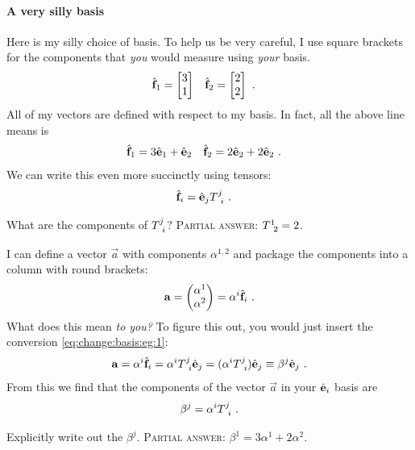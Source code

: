 \paragraph{A very silly basis}
Here is my silly choice of basis. To help us be very careful, I use square brackets for the components that \emph{you} would measure using \emph{your} basis. 
\begin{align}
    \hat{\mathbf{f}}_1 &=
    \begin{bmatrix}
        3 \\ 1
    \end{bmatrix}
    &
    \hat{\mathbf{f}}_2 &=
    \begin{bmatrix}
        2 \\ 2
    \end{bmatrix} \ .
\end{align}
All of my vectors are defined with respect to my basis. In fact, all the above line means is
\begin{align}
    \hat{\mathbf{f}}_1 &= 3\hat{\mathbf{e}}_1 + \hat{\mathbf{e}}_2
    &
    \hat{\mathbf{f}}_2 &= 2\hat{\mathbf{e}}_2 + 2\hat{\mathbf{e}}_2
    \ .
    \label{eq:change:basis:eg:1}
\end{align}
We can write this even more succinctly using tensors:
\begin{align}
    \bas{f}_i &= \bas{e}_j T\aij{j}{i} \ .
    \label{eq:change:basis:eg:2}
\end{align}
\begin{exercise}
What are the components of $T\aij{j}{i}$? \textsc{Partial answer:} $T\aij{1}{2} = 2$.
\end{exercise}


I can define a vector $\vec{a}$ with components $\alpha^{1,2}$ and package the components into a column with round brackets:
\begin{align}
    \mathbf{a} 
    = \begin{pmatrix}
        \alpha^1 \\ \alpha^2
    \end{pmatrix}
    =
    \alpha^i \hat{\mathbf{f}}_i  \ .
\end{align}
What does this mean \emph{to you?} To figure this out, you would just insert the conversion \eqref{eq:change:basis:eg:1}:
\begin{align}
    \vec{a} = \alpha^i \bas{f}_i = \alpha^i T\aij{j}{i} \bas{e}_j = (\alpha^i T\aij{j}{i})\bas{e}_j \equiv \beta^j \bas{e}_j \ .
\end{align}
From this we find that the components of the vector $\vec{a}$ in your $\hat{\mathbf{e}}_i$ basis are
\begin{align}
    \beta^j = \alpha^i T\aij{j}{i} \ . 
    \label{eq:beta:alpha:T:convert}
\end{align}
\begin{exercise}
Explicitly write out the $\beta^j$. \textsc{Partial answer:} $\beta^1 = 3\alpha^1 + 2\alpha^2$.
\end{exercise}


